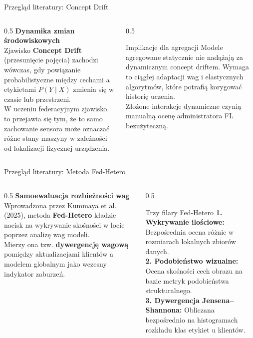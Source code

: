 \documentclass[9pt,aspectratio=169]{beamer}
\begin{document}
\begin{frame}{Przegląd literatury: Concept Drift}
\begin{columns}[T]
\begin{column}{0.5\textwidth}
\textbf{Dynamika zmian środowiskowych}\\[4pt]
Zjawisko \textbf{Concept Drift} (przesunięcie pojęcia) zachodzi wówczas, gdy powiązanie probabilistyczne między cechami a etykietami $P(Y\mid X)$ zmienia się w czasie lub przestrzeni.\\[6pt]
W uczeniu federacyjnym zjawisko to przejawia się tym, że to samo zachowanie sensora może oznaczać różne stany maszyny w zależności od lokalizacji fizycznej urządzenia.
\end{column}
\begin{column}{0.5\textwidth}
\begin{infobox}{Implikacje dla agregacji}
Modele agregowane statycznie nie nadążają za dynamicznym concept driftem. Wymaga to ciągłej adaptacji wag i elastycznych algorytmów, które potrafią korygować historię uczenia.\\[6pt]
Złożone interakcje dynamiczne czynią manualną ocenę administratora FL bezużyteczną.
\end{infobox}
\end{column}
\end{columns}
\end{frame}

\begin{frame}{Przegląd literatury: Metoda Fed-Hetero}
\begin{columns}[T]
\begin{column}{0.5\textwidth}
\textbf{Samoewaluacja rozbieżności wag}\\[4pt]
Wprowadzona przez Kummaya et al. (2025), metoda \textbf{Fed-Hetero} kładzie nacisk na wykrywanie skośności w locie poprzez analizę wag modeli.\\[6pt]
Mierzy ona tzw. \textbf{dywergencję wagową} pomiędzy aktualizacjami klientów a modelem globalnym jako wczesny indykator zaburzeń.
\end{column}
\begin{column}{0.5\textwidth}
\begin{infoboxgreen}{Trzy filary Fed-Hetero}
\textbf{1. Wykrywanie ilościowe:} Bezpośrednia ocena różnic w rozmiarach lokalnych zbiorów danych.\\[4pt]
\textbf{2. Podobieństwo wizualne:} Ocena skośności cech obrazu na bazie metryk podobieństwa strukturalnego.\\[4pt]
\textbf{3. Dywergencja Jensena--Shannona:} Obliczana bezpośrednio na histogramach rozkładu klas etykiet u klientów.
\end{infoboxgreen}
\end{column}
\end{columns}
\end{frame}
\end{document}
